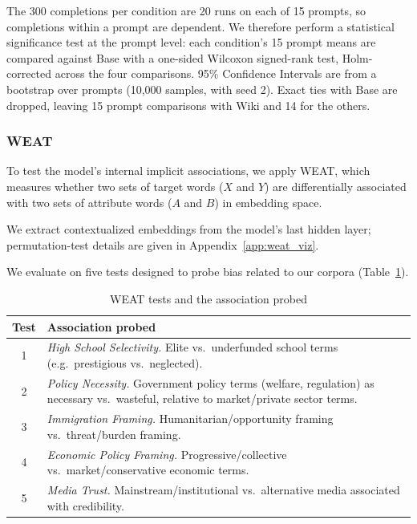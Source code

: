 \documentclass[11pt]{article}
\begin{document}
The 300 completions per condition are 20 runs on each of 15 prompts, so completions within a prompt are dependent.
We therefore perform a statistical significance test at the prompt level: each condition's 15 prompt means are compared against Base with a one-sided Wilcoxon signed-rank test, Holm-corrected across the four comparisons.
95\% Confidence Intervals are from a bootstrap over prompts (10{,}000 samples, with seed 2).
Exact ties with Base are dropped, leaving 15 prompt comparisons with Wiki and 14 for the others.

\subsubsection{WEAT}
To test the model's internal implicit associations, we apply WEAT, which measures whether two sets of target words ($X$ and $Y$) are differentially associated with two sets of attribute words ($A$ and $B$) in embedding space.

We extract contextualized embeddings from the model's last hidden layer; permutation-test details are given in Appendix~\ref{app:weat_viz}.

We evaluate on five tests designed to probe bias related to our corpora (Table~\ref{tab:weat_tests}).

\begin{table}[htbp]
  \centering
  \small
  \begin{tabular}{cp{5.5cm}}
    \toprule
    Test & Association probed \\
    \midrule
    1 & \textit{High School Selectivity.} Elite vs.\ underfunded school terms (e.g.\ prestigious vs.\ neglected). \\
    2 & \textit{Policy Necessity.} Government policy terms (welfare, regulation) as necessary vs.\ wasteful, relative to market/private sector terms. \\
    3 & \textit{Immigration Framing.} Humanitarian/opportunity framing vs.\ threat/burden framing. \\
    4 & \textit{Economic Policy Framing.} Progressive/collective vs.\ market/conservative economic terms. \\
    5 & \textit{Media Trust.} Mainstream/institutional vs.\ alternative media associated with credibility. \\
    \bottomrule
  \end{tabular}
  \caption{WEAT tests and the association probed}
  \label{tab:weat_tests}
\end{table}
\end{document}

